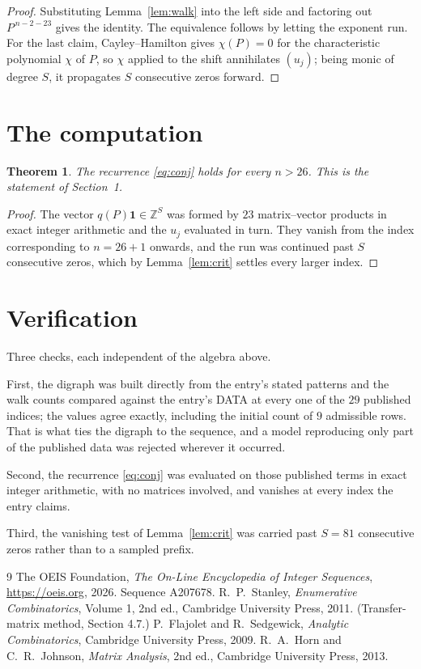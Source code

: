 \documentclass[11pt,a4paper]{article}
\theoremstyle{plain}
\newtheorem{theorem}{Theorem}
\theoremstyle{definition}
\begin{document}
\begin{proof}
Substituting Lemma~\ref{lem:walk} into the left side and factoring out
$P^{\,n-2-23}$ gives the identity. The equivalence follows by letting the exponent
run. For the last claim, Cayley--Hamilton gives $\chi(P)=0$ for the characteristic
polynomial $\chi$ of $P$, so $\chi$ applied to the shift annihilates $(u_j)$; being monic of
degree $S$, it propagates $S$ consecutive zeros forward.
\end{proof}

\section{The computation}

\begin{theorem}
The recurrence \eqref{eq:conj} holds for every $n>26$. This is the statement of
Section~1.
\end{theorem}

\begin{proof}
The vector $q(P)\mathbf{1}\in\mathbb{Z}^{S}$ was formed by $23$ matrix--vector
products in exact integer arithmetic and the $u_j$ evaluated in turn. They vanish from the
index corresponding to $n=26+1$ onwards, and the run was continued past $S$ consecutive
zeros, which by Lemma~\ref{lem:crit} settles every larger index.
\end{proof}

\section{Verification}

Three checks, each independent of the algebra above.

First, the digraph was built directly from the entry's stated patterns and the walk counts
compared against the entry's DATA at every one of the $29$ published indices; the
values agree exactly, including the initial count of $9$ admissible rows. That is
what ties the digraph to the sequence, and a model reproducing only part of the published
data was rejected wherever it occurred.

Second, the recurrence \eqref{eq:conj} was evaluated on those published terms in exact
integer arithmetic, with no matrices involved, and vanishes at every index the entry claims.

Third, the vanishing test of Lemma~\ref{lem:crit} was carried past $S=81$ consecutive
zeros rather than to a sampled prefix.

\begin{thebibliography}{9}
 The OEIS Foundation, \emph{The On-Line Encyclopedia of Integer
Sequences}, \url{https://oeis.org}, 2026. Sequence A207678.
 R.~P.~Stanley, \emph{Enumerative Combinatorics}, Volume 1, 2nd ed.,
Cambridge University Press, 2011. (Transfer-matrix method, Section 4.7.)
 P.~Flajolet and R.~Sedgewick, \emph{Analytic Combinatorics}, Cambridge
University Press, 2009.
 R.~A.~Horn and C.~R.~Johnson, \emph{Matrix Analysis}, 2nd ed., Cambridge
University Press, 2013.
\end{thebibliography}
\end{document}
